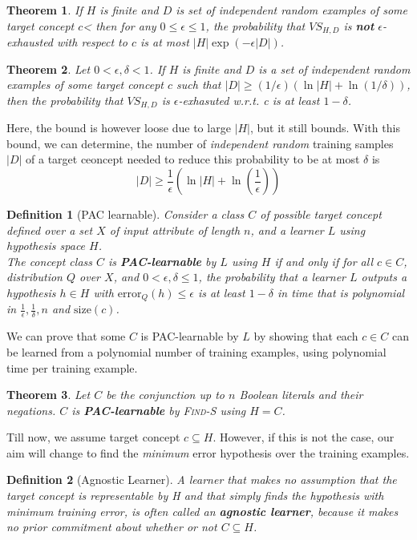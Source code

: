 \documentclass[12pt]{article}
\newtheorem{definition}{Definition}[section]
\newtheorem{theorem}{Theorem}[section]
\theoremstyle{definition}
\begin{document}
\begin{theorem}\normalfont If $H$ is finite and $D$ is set of independent random examples of some target concept $c$< then for any $0\leq \epsilon\leq 1$, the probability that $VS_{H,D}$ is \textbf{not} $\epsilon$-exhausted with respect to $c$ is at most $|H|\exp(-\epsilon|D|)$.
\end{theorem}
\begin{theorem}\normalfont Let $0<\epsilon, \delta<1$. If $H$ is finite and $D$ is a set of independent random examples of some target concept $c$ such that $|D| \geq (1/\epsilon)(\ln|H| +\ln(1/\delta))$, then the probability that $VS_{H,D}$ is $\epsilon$-exhasuted w.r.t. c is at least $1-\delta$.
\end{theorem}
Here, the bound is however loose due to large $|H|$, but it still bounds. With this bound, we can determine, the number of \textit{independent random} training samples $|D|$ of a target ceoncept needed to reduce this probability to be at most $\delta$ is
\[
|D|\geq \frac{1}{\epsilon}(\ln |H|+\ln(\frac{1}{\epsilon}))
\]
\begin{definition}[PAC learnable]
\normalfont Consider a class $C$ of possible target concept defined over a set $X$ of input attribute of length $n$, and a learner $L$ using hypothesis space $H$. \\
The concept class $C$ is \textbf{PAC-learnable} by $L$ using $H$ \textit{if and only if} for all $c\in C$, distribution $Q$ over $X$, and $0<\epsilon, \delta\leq 1$, the probability that a learner $L$ outputs a hypothesis $h\in H$ with $\text{error}_Q(h)\leq \epsilon$ is at least $1-\delta$ in time that is polynomial in $\frac{1}{\epsilon}, \frac{1}{\delta}, n$ and $\text{size}(c)$.
\end{definition}
We can prove that some $C$ is PAC-learnable by $L$ by showing that each $c\in C$ can be learned from a polynomial number of training examples, using polynomial time per training example.
\begin{theorem}\normalfont Let $C$ be the conjunction up to $n$ Boolean literals and their negations. $C$ is \textbf{PAC-learnable} by \textsc{Find-S} using $H=C$.
\end{theorem}
Till now, we assume target concept $c\subseteq H$. However, if this is not the case, our aim will change to find the \textit{minimum} error hypothesis over the training examples.
\begin{definition}[Agnostic Learner]
\normalfont A learner that makes no assumption that the target concept is representable by H and that simply finds the hypothesis with minimum training error, is often called an \textbf{agnostic learner}, because it makes no prior commitment about whether or not $C\subseteq H$.
\end{definition}
\end{document}
